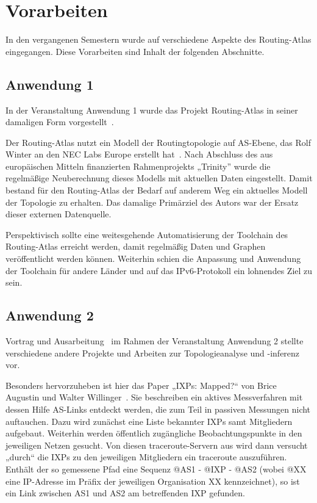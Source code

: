 \section{Vorarbeiten}\label{sec:previous}

In den vergangenen Semestern wurde auf verschiedene Aspekte des Routing-Atlas eingegangen.
Diese Vorarbeiten sind Inhalt der folgenden Abschnitte.

\subsection{Anwendung 1}
In der Veranstaltung Anwendung 1 wurde das Projekt Routing-Atlas in seiner damaligen Form vorgestellt~\cite{KrohnAW1}.

Der Routing-Atlas nutzt ein Modell der Routingtopologie auf AS-Ebene, das Rolf Winter an den NEC Labs Europe erstellt hat~\cite{neclab-topology, Winter:2009:MIR:1577959.1577976}.
Nach Abschluss des aus europäischen Mitteln finanzierten Rahmenprojekts „Trinity” wurde die regelmäßige Neuberechnung dieses Modells mit aktuellen Daten eingestellt.
Damit bestand für den Routing-Atlas der Bedarf auf anderem Weg ein aktuelles Modell der Topologie zu erhalten.
Das damalige Primärziel des Autors war der Ersatz dieser externen Datenquelle.

Perspektivisch sollte eine weitesgehende Automatisierung der Toolchain des Routing-Atlas erreicht werden, damit regelmäßig Daten und Graphen veröffentlicht werden können.
Weiterhin schien die Anpassung und Anwendung der Toolchain für andere Länder und auf das IPv6-Protokoll ein lohnendes Ziel zu sein.

\subsection{Anwendung 2}
Vortrag und Ausarbeitung~\cite{KrohnAW2} im Rahmen der Veranstaltung Anwendung 2 stellte verschiedene andere Projekte und Arbeiten zur Topologieanalyse und -inferenz vor.

Besonders hervorzuheben ist hier das Paper „IXPs: Mapped?“ von Brice Augustin und Walter Willinger~\cite{Augustin:2009:IM:1644893.1644934}.
Sie beschreiben ein aktives Messverfahren mit dessen Hilfe AS-Links entdeckt werden, die zum Teil in passiven Messungen nicht auftauchen.
Dazu wird zunächst eine Liste bekannter IXPs samt Mitgliedern aufgebaut.
Weiterhin werden öffentlich zugängliche Beobachtungspunkte in den jeweiligen Netzen gesucht.
Von diesen traceroute-Servern aus wird dann versucht „durch“ die IXPs zu den jeweiligen Mitgliedern ein traceroute auszuführen.
Enthält der so gemessene Pfad eine Sequenz @AS1 - @IXP - @AS2 (wobei @XX eine IP-Adresse im Präfix der jeweiligen Organisation XX kennzeichnet), so ist ein Link zwischen AS1 und AS2 am betreffenden IXP gefunden.

